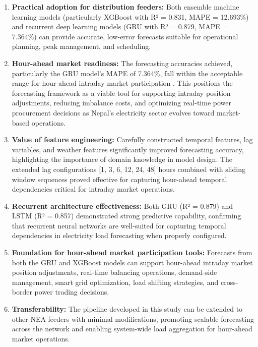 \documentclass[oneside, 12pt]{book}
\numberwithin{equation}{chapter}
\begin{document}
\begin{enumerate}
    \item \textbf{Practical adoption for distribution feeders:} Both ensemble machine learning models (particularly XGBoost with R² = 0.831, MAPE = 12.693\%) and recurrent deep learning models (GRU with R² = 0.879, MAPE = 7.364\%) can provide accurate, low-error forecasts suitable for operational planning, peak management, and scheduling.
    
    \item \textbf{Hour-ahead market readiness:} The forecasting accuracies achieved, particularly the GRU model's MAPE of 7.364\%, fall within the acceptable range for hour-ahead intraday market participation \parencite{weron2014electricity}. This positions the forecasting framework as a viable tool for supporting intraday position adjustments, reducing imbalance costs, and optimizing real-time power procurement decisions as Nepal's electricity sector evolves toward market-based operations.
    
    \item \textbf{Value of feature engineering:} Carefully constructed temporal features, lag variables, and weather features significantly improved forecasting accuracy, highlighting the importance of domain knowledge in model design. The extended lag configurations [1, 3, 6, 12, 24, 48] hours combined with sliding window sequences proved effective for capturing hour-ahead temporal dependencies critical for intraday market operations.
    
    \item \textbf{Recurrent architecture effectiveness:} Both GRU (R² = 0.879) and LSTM (R² = 0.857) demonstrated strong predictive capability, confirming that recurrent neural networks are well-suited for capturing temporal dependencies in electricity load forecasting when properly configured.
    
    \item \textbf{Foundation for hour-ahead market participation tools:} Forecasts from both the GRU and XGBoost models can support hour-ahead intraday market position adjustments, real-time balancing operations, demand-side management, smart grid optimization, load shifting strategies, and cross-border power trading decisions.
    
    \item \textbf{Transferability:} The pipeline developed in this study can be extended to other NEA feeders with minimal modifications, promoting scalable forecasting across the network and enabling system-wide load aggregation for hour-ahead market operations.
\end{enumerate}
\end{document}
